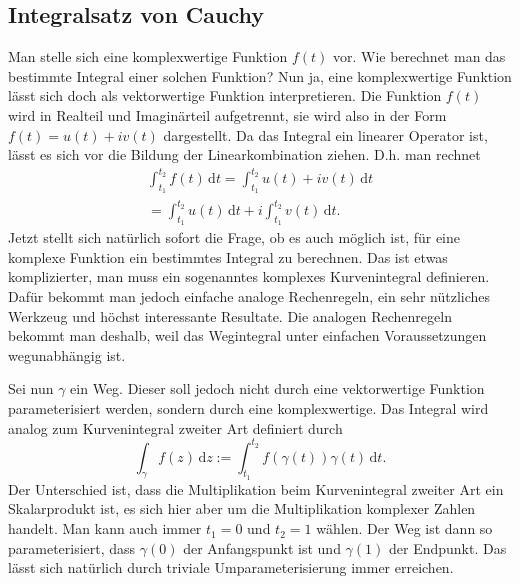 \documentclass[a4paper,10pt,fleqn,twocolumn,twoside]{article}
\begin{document}
\subsection{Integralsatz von Cauchy}

Man stelle sich eine komplexwertige Funktion \(f(t)\) vor.
Wie berechnet man das bestimmte Integral einer solchen Funktion?
Nun ja, eine komplexwertige Funktion lässt sich doch als vektorwertige
Funktion interpretieren. Die Funktion \(f(t)\) wird in Realteil und
Imaginärteil aufgetrennt, sie wird also in der Form
\(f(t)=u(t)+iv(t)\) dargestellt.
Da das Integral ein linearer Operator ist,
lässt es sich vor die Bildung der Linearkombination ziehen.
D.h. man rechnet
\begin{gather*}
\int_{t_1}^{t_2} f(t)\,\mathrm dt
= \int_{t_1}^{t_2} u(t)+iv(t)\,\mathrm dt\\
= \int_{t_1}^{t_2} u(t)\,\mathrm dt + i\int_{t_1}^{t_2}
v(t)\,\mathrm dt.
\end{gather*}
Jetzt stellt sich natürlich sofort die Frage, ob es auch möglich ist,
für eine komplexe Funktion ein bestimmtes Integral zu berechnen.
Das ist etwas komplizierter, man muss ein sogenanntes komplexes
Kurvenintegral definieren. Dafür bekommt man jedoch einfache analoge
Rechenregeln, ein sehr nützliches Werkzeug und höchst interessante
Resultate. Die analogen Rechenregeln bekommt man deshalb,
weil das Wegintegral unter einfachen Voraussetzungen
wegunabhängig ist.

Sei nun \(\gamma\) ein Weg. Dieser soll jedoch nicht durch eine
vektorwertige Funktion parameterisiert werden, sondern durch
eine komplexwertige. Das Integral wird analog zum Kurvenintegral
zweiter Art definiert durch
\[\int_\gamma f(z)\,\mathrm dz
:= \int_{t_1}^{t_2} f(\gamma(t))\gamma(t)\,\mathrm dt.\]
Der Unterschied ist, dass die Multiplikation beim Kurvenintegral
zweiter Art ein Skalarprodukt ist, es sich hier aber um die
Multiplikation komplexer Zahlen handelt.
Man kann auch immer \(t_1=0\) und \(t_2=1\) wählen.
Der Weg ist dann so parameterisiert, dass \(\gamma(0)\)
der Anfangspunkt ist und \(\gamma(1)\) der Endpunkt. Das lässt
sich natürlich durch triviale Umparameterisierung immer erreichen.
\end{document}
